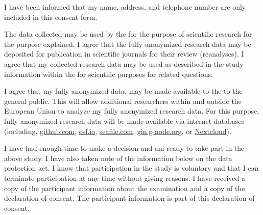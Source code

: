 \documentclass[11pt,twoside,a4paper]{article}
\begin{document}
I have been informed that my name, address, and telephone number are only included in this consent form.


The data collected may be used by the \ApplicantUniversity{} for the purpose of scientific research for the purpose explained.
I agree that the fully anonymized research data may be deposited for publication in scientific journals for their review (reanalyses).
I agree that my collected research data may be used as described in the study information within the \ApplicantUniversity{} for scientific purposes for related questions.

I agree that my fully anonymized data, may be made available to the to the general public.
This will allow additional researchers within and outside the European Union to analyze my fully anonymized research data.
For this purpose, fully anonymized research data will be made available via internet databases (including, \href{https://github.com/}{github.com}, \href{https://osf.io/}{osf.io}, \href{https://www.seafile.com/en/home/}{seafile.com}, \href{https://gin.g-node.org/}{gin.g-node.org}, or \href{https://cloud.uni-hamburg.de/}{Nextcloud}).

I have had enough time to make a decision and am ready to take part in the above study.
I have also taken note of the information below on the data protection act.
I know that participation in the study is voluntary and that I can terminate participation at any time without giving reasons.
I have received a copy of the participant information about the examination and a copy of the declaration of consent.
The participant information is part of this declaration of consent.
\end{document}
